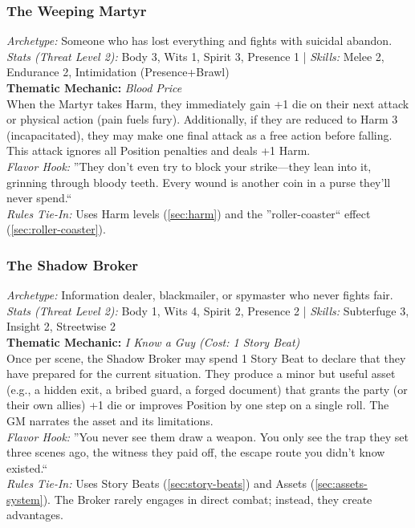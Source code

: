 \subsubsection{The Weeping Martyr}
\textit{Archetype:} Someone who has lost everything and fights with suicidal abandon.\\
\textit{Stats (Threat Level 2):} Body 3, Wits 1, Spirit 3, Presence 1 \quad | \quad \textit{Skills:} Melee 2, Endurance 2, Intimidation (Presence+Brawl)\\
\textbf{Thematic Mechanic:} \textit{Blood Price} \\
When the Martyr takes Harm, they immediately gain +1 die on their next attack or physical action (pain fuels fury). Additionally, if they are reduced to Harm 3 (incapacitated), they may make one final attack as a free action before falling. This attack ignores all Position penalties and deals +1 Harm.\\
\textit{Flavor Hook:} ''They don't even try to block your strike---they lean into it, grinning through bloody teeth. Every wound is another coin in a purse they'll never spend.``\\
\textit{Rules Tie-In:} Uses Harm levels (\autoref{sec:harm}) and the ''roller-coaster`` effect (\autoref{sec:roller-coaster}).

\subsubsection{The Shadow Broker}
\textit{Archetype:} Information dealer, blackmailer, or spymaster who never fights fair.\\
\textit{Stats (Threat Level 2):} Body 1, Wits 4, Spirit 2, Presence 2 \quad | \quad \textit{Skills:} Subterfuge 3, Insight 2, Streetwise 2\\
\textbf{Thematic Mechanic:} \textit{I Know a Guy (Cost: 1 Story Beat)} \\
Once per scene, the Shadow Broker may spend 1 Story Beat to declare that they have prepared for the current situation. They produce a minor but useful asset (e.g., a hidden exit, a bribed guard, a forged document) that grants the party (or their own allies) +1 die or improves Position by one step on a single roll. The GM narrates the asset and its limitations.\\
\textit{Flavor Hook:} ''You never see them draw a weapon. You only see the trap they set three scenes ago, the witness they paid off, the escape route you didn't know existed.``\\
\textit{Rules Tie-In:} Uses Story Beats (\autoref{sec:story-beats}) and Assets (\autoref{sec:assets-system}). The Broker rarely engages in direct combat; instead, they create advantages.


